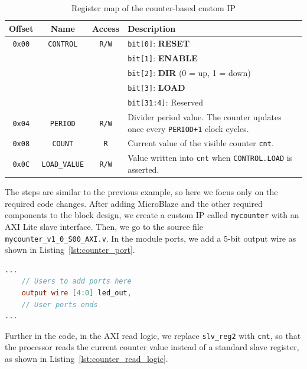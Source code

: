 \documentclass{article}
\begin{document}
\begin{table}[H]
\centering
\renewcommand{\arraystretch}{1.4}
\begin{tabular}{|c|c|c|p{8.2cm}|}
\hline
\textbf{Offset} & \textbf{Name} & \textbf{Access} & \textbf{Description} \\
\hline
\texttt{0x00} & \texttt{CONTROL} & \texttt{R/W} &
\texttt{bit[0]}: \textbf{RESET}\\
&&&
\texttt{bit[1]}: \textbf{ENABLE}\\
&&&
\texttt{bit[2]}: \textbf{DIR} (0 = up, 1 = down)\\
&&&
\texttt{bit[3]}: \textbf{LOAD}\\
&&&
\texttt{bit[31:4]}: Reserved
\\
\hline
\texttt{0x04} & \texttt{PERIOD} & \texttt{R/W} &
Divider period value. The counter updates once every \texttt{PERIOD+1} clock cycles.
\\
\hline
\texttt{0x08} & \texttt{COUNT} & \texttt{R} &
Current value of the visible counter \texttt{cnt}.
\\
\hline
\texttt{0x0C} & \texttt{LOAD\_VALUE} & \texttt{R/W} &
Value written into \texttt{cnt} when \texttt{CONTROL.LOAD} is asserted.
\\
\hline
\end{tabular}
\caption{Register map of the counter-based custom IP}
\label{tab:counter_register_map}
\end{table}


The steps are similar to the previous example, so here we focus only on the required code changes. After adding MicroBlaze and the other required components to the block design, we create a custom IP called \texttt{mycounter} with an AXI Lite slave interface. Then, we go to the source file \texttt{mycounter\_v1\_0\_S00\_AXI.v}. In the module ports, we add a 5-bit output wire as shown in Listing~\ref{lst:counter_port}.

\begin{lstlisting}[language=Verilog, caption={Adding the LED output port to the custom counter IP}, label={lst:counter_port}]
...
    // Users to add ports here
    output wire [4:0] led_out,
    // User ports ends
...
\end{lstlisting}

Further in the code, in the AXI read logic, we replace \texttt{slv\_reg2} with \texttt{cnt}, so that the processor reads the current counter value instead of a standard slave register, as shown in Listing~\ref{lst:counter_read_logic}.
\end{document}
